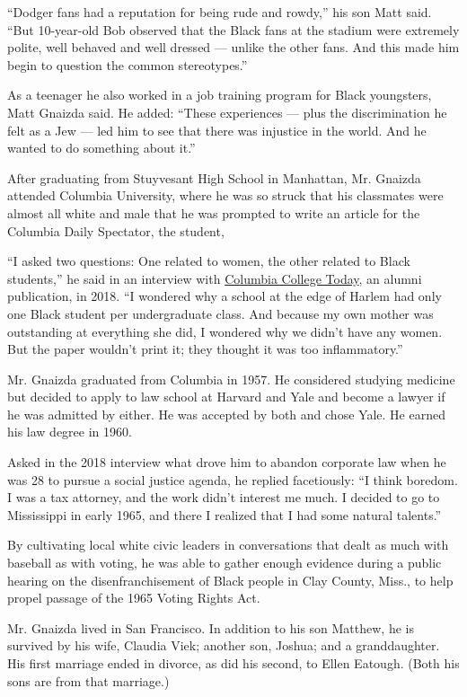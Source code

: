 ``Dodger fans had a reputation for being rude and rowdy,'' his son Matt
said. ``But 10-year-old Bob observed that the Black fans at the stadium
were extremely polite, well behaved and well dressed --- unlike the
other fans. And this made him begin to question the common
stereotypes.''

As a teenager he also worked in a job training program for Black
youngsters, Matt Gnaizda said. He added: ``These experiences --- plus
the discrimination he felt as a Jew --- led him to see that there was
injustice in the world. And he wanted to do something about it.''

After graduating from Stuyvesant High School in Manhattan, Mr. Gnaizda
attended Columbia University, where he was so struck that his classmates
were almost all white and male that he was prompted to write an article
for the Columbia Daily Spectator, the student,

``I asked two questions: One related to women, the other related to
Black students,'' he said in an interview with
\href{https://www.college.columbia.edu/cct/latest/minds/talking-social-advocacy-robert-gnaizda-57-and-rebecca-kee-05}{Columbia
College Today}, an alumni publication, in 2018. ``I wondered why a
school at the edge of Harlem had only one Black student per
undergraduate class. And because my own mother was outstanding at
everything she did, I wondered why we didn't have any women. But the
paper wouldn't print it; they thought it was too inflammatory.''

Mr. Gnaizda graduated from Columbia in 1957. He considered studying
medicine but decided to apply to law school at Harvard and Yale and
become a lawyer if he was admitted by either. He was accepted by both
and chose Yale. He earned his law degree in 1960.

Asked in the 2018 interview what drove him to abandon corporate law when
he was 28 to pursue a social justice agenda, he replied facetiously: ``I
think boredom. I was a tax attorney, and the work didn't interest me
much. I decided to go to Mississippi in early 1965, and there I realized
that I had some natural talents.''

By cultivating local white civic leaders in conversations that dealt as
much with baseball as with voting, he was able to gather enough evidence
during a public hearing on the disenfranchisement of Black people in
Clay County, Miss., to help propel passage of the 1965 Voting Rights
Act.

Mr. Gnaizda lived in San Francisco. In addition to his son Matthew, he
is survived by his wife, Claudia Viek; another son, Joshua; and a
granddaughter. His first marriage ended in divorce, as did his second,
to Ellen Eatough. (Both his sons are from that marriage.)

